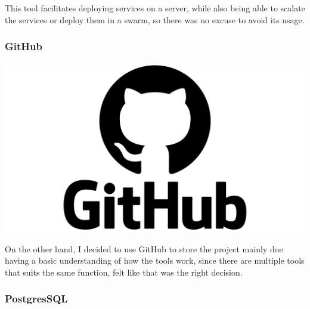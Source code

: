 \documentclass[11pt]{article}
\begin{document}
        \begin{flushleft}
            This tool facilitates deploying services on a server, while also being able to scalate the services or
            deploy them in a swarm, so there was no excuse to avoid its usage.
        \end{flushleft}

        \subsubsection[GitHub]{GitHub}

        \begin{center}
            \includegraphics[scale=0.045]{logo_github}
        \end{center}

        \begin{flushleft}
            On the other hand, I decided to use GitHub to store the project mainly due having a basic understanding of how
            the tools work, since there are multiple tools that suits the same function, felt like that was the right decision.
        \end{flushleft}


        \newpage
        \subsubsection[PostgreSQL]{PostgresSQL}
\end{document}
